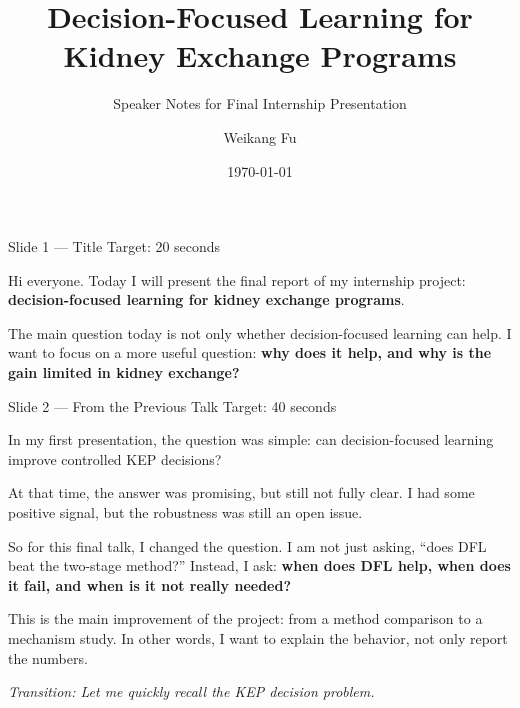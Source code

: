 \documentclass[11pt,aspectratio=169]{beamer}
\title{Decision-Focused Learning for Kidney Exchange Programs}
\subtitle{Speaker Notes for Final Internship Presentation}
\author{Weikang Fu}
\date{\today}
\newcommand{\kw}[1]{\textcolor{navyblue}{\textbf{#1}}}
\newcommand{\tr}[1]{\vspace{0.35em}\textit{\textcolor{black!55}{Transition: #1}}}
\newcommand{\timing}[1]{\textcolor{black!45}{\scriptsize Target: #1}\par\vspace{0.25em}}
\begin{document}
\begin{frame}{Slide 1 \enspace\textmd{\small\textcolor{black!40}{--- Title}}}
\small
\timing{20 seconds}

Hi everyone. Today I will present the final report of my internship project: \kw{decision-focused learning for kidney exchange programs}.

\vspace{0.35em}
The main question today is not only whether decision-focused learning can help. I want to focus on a more useful question: \kw{why does it help, and why is the gain limited in kidney exchange?}

\end{frame}

\begin{frame}{Slide 2 \enspace\textmd{\small\textcolor{black!40}{--- From the Previous Talk}}}
\small
\timing{40 seconds}

In my first presentation, the question was simple: can decision-focused learning improve controlled KEP decisions?

\vspace{0.35em}
At that time, the answer was promising, but still not fully clear. I had some positive signal, but the robustness was still an open issue.

\vspace{0.35em}
So for this final talk, I changed the question. I am not just asking, ``does DFL beat the two-stage method?'' Instead, I ask: \kw{when does DFL help, when does it fail, and when is it not really needed?}

\vspace{0.35em}
This is the main improvement of the project: from a method comparison to a mechanism study. In other words, I want to explain the behavior, not only report the numbers.

\tr{Let me quickly recall the KEP decision problem.}
\end{frame}
\end{document}
